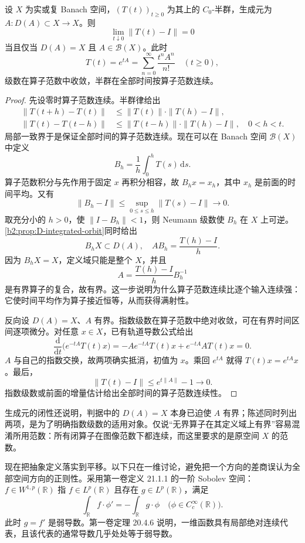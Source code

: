\begin{proposition}[范数连续与有界生成元]\label{b2:prop:D-uniform-continuity}
设 \(X\) 为实或复 Banach 空间，\((T(t))_{t\geq0}\) 为其上的 \(C_0\)-半群，生成元为 \(A:D(A)\subset X\to X\)。则
\[
 \lim_{t\downarrow0}\|T(t)-I\|=0
\]
当且仅当 \(D(A)=X\) 且 \(A\in\mathcal B(X)\)。此时
\[
 T(t)=e^{tA}
 =\sum_{n=0}^{\infty}\frac{t^nA^n}{n!}\quad(t\geq0),
\]
级数在算子范数中收敛，半群在全部时间按算子范数连续。
\end{proposition}
\begin{proof}
先设零时算子范数连续。半群律给出
\[
 \begin{aligned}
 \|T(t+h)-T(t)\|
 &\leq\|T(t)\|\cdot\|T(h)-I\|,\\
 \|T(t)-T(t-h)\|
 &\leq\|T(t-h)\|\cdot\|T(h)-I\|,
 \quad 0<h<t.
 \end{aligned}
\]
局部一致界于是保证全部时间的算子范数连续。现在可以在 Banach 空间 \(\mathcal B(X)\) 中定义
\[
 B_h=\frac1h\int_0^hT(s)\,\mathrm ds.
\]
算子范数积分与先作用于固定 \(x\) 再积分相容，故 \(B_hx=x_h\)，其中 \(x_h\) 是前面的时间平均。又有
\[
 \|B_h-I\|\leq\sup_{0\leq s\leq h}\|T(s)-I\|\longrightarrow0.
\]
取充分小的 \(h>0\)，使 \(\|I-B_h\|<1\)，则 Neumann 级数使 \(B_h\) 在 \(X\) 上可逆。\cref{b2:prop:D-integrated-orbit}同时给出
\[
 B_hX\subset D(A),\quad
 AB_h=\frac{T(h)-I}{h}.
\]
因为 \(B_hX=X\)，定义域只能是整个 \(X\)，并且
\[
 A=\frac{T(h)-I}{h}B_h^{-1}
\]
是有界算子的复合，故有界。这一步说明为什么算子范数连续比逐个输入连续强：它使时间平均作为算子接近恒等，从而获得满射性。

反向设 \(D(A)=X\)、\(A\) 有界。指数级数在算子范数中绝对收敛，可在有界时间区间逐项微分。对任意 \(x\in X\)，已有轨道导数公式给出
\[
 \frac{\mathrm d}{\mathrm dt}
       \bigl(e^{-tA}T(t)x\bigr)
 =-Ae^{-tA}T(t)x+e^{-tA}AT(t)x=0.
\]
\(A\) 与自己的指数交换，故两项确实抵消，初值为 \(x\)。乘回 \(e^{tA}\) 就得 \(T(t)x=e^{tA}x\)。最后，
\[
 \|T(t)-I\|\leq e^{t\|A\|}-1\longrightarrow0.
\]
指数级数或前面的增量估计给出全部时间的算子范数连续性。
\end{proof}
生成元的闭性还说明，判据中的 \(D(A)=X\) 本身已迫使 \(A\) 有界；陈述同时列出两项，是为了明确指数级数的适用对象。仅说“无界算子在其定义域上有界”容易混淆所用范数：所有闭算子在图像范数下都连续，而这里要求的是原空间 \(X\) 的范数。

\ProseParagraphBreak

现在把抽象定义落实到平移。以下只在一维讨论，避免把一个方向的差商误认为全部空间方向的正则性。采用第一卷定义 21.1.1 的一阶 Sobolev 空间：\(f\in W^{1,p}(\mathbb R)\) 指 \(f\in L^p(\mathbb R)\) 且存在 \(g\in L^p(\mathbb R)\)，满足
\[
 \int_{\mathbb R}f\cdot\phi'
 =-\int_{\mathbb R}g\cdot\phi
 \quad\bigl(\phi\in C_c^\infty(\mathbb R)\bigr).
\]
此时 \(g=f'\) 是弱导数。第一卷定理 20.4.6 说明，一维函数具有局部绝对连续代表，且该代表的通常导数几乎处处等于弱导数。

